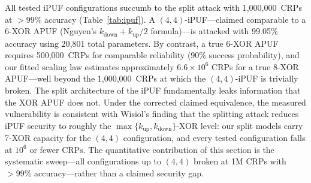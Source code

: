 All tested iPUF configurations succumb to the split attack with
1{,}000{,}000~CRPs at $> 99\%$ accuracy (Table~\ref{tab:ipuf}).
A $(4,4)$-iPUF---claimed comparable to a 6-XOR APUF (Nguyen's
$k_{\text{down}}+k_{\text{up}}/2$ formula)---is attacked with
99.05\% accuracy using 20{,}801 total parameters.
By contrast, a true 6-XOR APUF
requires 500{,}000~CRPs for comparable reliability (90\% success
probability), and our fitted scaling law estimates approximately
$6.6\times 10^6$ CRPs for a true 8-XOR APUF---well beyond the
1{,}000{,}000~CRPs at which the $(4,4)$-iPUF is trivially broken.
The split architecture of the iPUF fundamentally leaks information that the
XOR APUF does not.
Under the corrected claimed equivalence, the measured vulnerability is
consistent with Wisiol's finding that the splitting attack reduces iPUF
security to roughly the $\max\{k_{\text{up}},k_{\text{down}}\}$-XOR level:
our split models carry 7-XOR capacity for the $(4,4)$ configuration, and
every tested configuration falls at $10^6$ or fewer CRPs.  The quantitative
contribution of this section is the systematic sweep---all configurations up
to $(4,4)$ broken at 1M CRPs with $>99\%$ accuracy---rather than a claimed
security gap.
